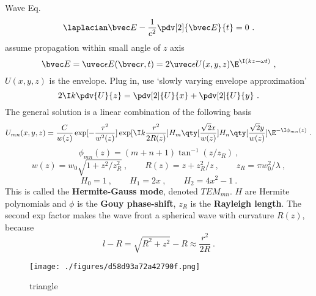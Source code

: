 
\begin{issues}
\issueDraft
\issueMissDepend
{}
\end{issues}


Wave Eq.
\begin{equation}
\laplacian \bvec E - \frac{1}{c^2} \pdv[2]{\bvec E}{t} = 0~.
\end{equation}
assume propagation within small angle of $z$ axis
\begin{equation}
\bvec E = \uvec \epsilon E(\bvec r, t) = 2\uvec \epsilon U(x, y, z) \E^{\I (kz - \omega t)}~,
\end{equation}
$U(x, y, z)$ is the envelope. Plug in, use ‘slowly varying envelope approximation’
\begin{equation}
2\I k\pdv{U}{z} = \pdv[2]{U}{x} + \pdv[2]{U}{y}~.
\end{equation}
The general solution is a linear combination of the following basis
\begin{equation}
U_{mn}(x, y, z) = \frac{C}{w(z)} \exp[-\frac{r^2}{w^2(z)}]\exp[\I k\frac{r^2}{2R(z)}] H_m\qty[\frac{\sqrt{2}x}{w(z)}] H_n \qty[\frac{\sqrt{2} y}{w(z)}] \E^{-\I \phi_{mn}(z)}~.
\end{equation}
\begin{equation}
\phi_{mn}(z) = (m+n+1)\tan^{-1}(z/z_R)~,
\end{equation}
\begin{equation}
w(z) = w_0\sqrt{1 + z^2/z_R^2}~,
\qquad
R(z) = z + z_R^2 / z~,
\qquad
z_R = \pi w_0^2 / \lambda~,
\end{equation}
\begin{equation}
H_0 = 1 ~,\qquad H_1 = 2x~, \qquad H_2 = 4x^2 - 1~.
\end{equation}
This is called the \textbf{Hermite-Gauss mode}, denoted $TEM_{mn}$. $H$ are Hermite polynomials and $\phi$ is the \textbf{Gouy phase-shift}, $z_R$ is the \textbf{Rayleigh length}. The second exp factor makes the wave front a spherical wave with curvature $R(z)$, because
\begin{equation}
l - R = \sqrt{R^2 + z^2} - R \approx \frac{r^2}{2R}~.
\end{equation}

\begin{figure}[ht]
\centering
\texttt{[image: ./figures/d58d93a72a42790f.png]}
\caption{triangle} \label{fig_GausBm_1}
\end{figure}

